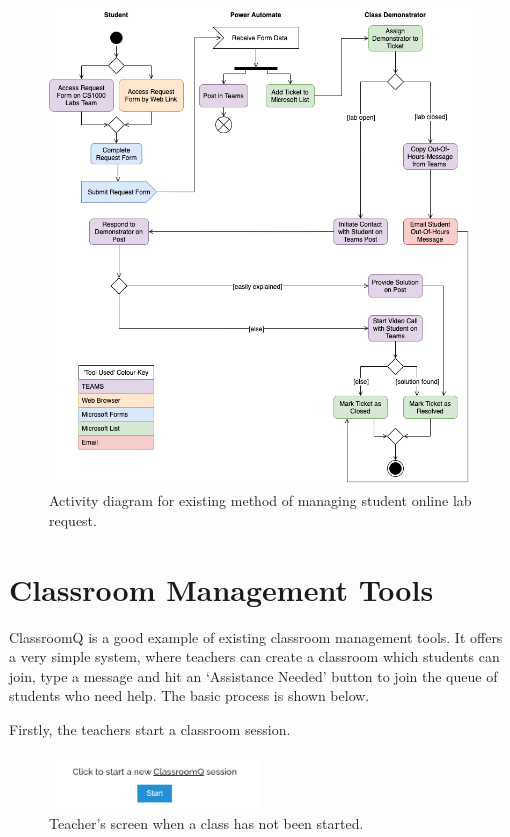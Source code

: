 \FloatBarrier
\begin{figure}[H]
  \centering
  \includegraphics[width=\textwidth]{2context/images/activityRevised.png}
  \caption{Activity diagram for existing method of managing student online lab request.}
\end{figure}

\newpage
\section{Classroom Management Tools}

ClassroomQ is a good example of existing classroom management tools. It offers a very simple system, where teachers can create a classroom which students can join, type a message and hit an `Assistance Needed' button to join the queue of students who need help. The basic process is shown below.

Firstly, the teachers start a classroom session.

\FloatBarrier
\begin{figure}[H]
  \centering
  \includegraphics[width=0.5\textwidth]{2context/images/cq1.png}
  \caption{Teacher's screen when a class has not been started.}
\end{figure}


